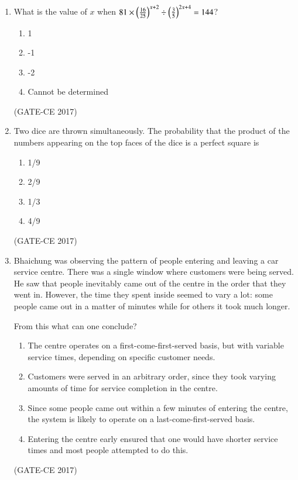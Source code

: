 \documentclass[journal,12pt,onecolumn]{article}
\theoremstyle{remark}
\begin{document}
\begin{enumerate}
    \item What is the value of $ x $ when $ 81 \times \left(\frac{16}{25}\right)^{x+2} \div \left(\frac{3}{5}\right)^{2x+4} = 144 $?
    \begin{multicols}{2}
    \begin{enumerate}
        \item 1  
        \item -1  
        \item -2  
        \item Cannot be determined  
    \end{enumerate}
    \end{multicols}
    \hfill (GATE-CE 2017)

    \item Two dice are thrown simultaneously. The probability that the product of the numbers appearing on the top faces of the dice is a perfect square is
    \begin{multicols}{4}
    \begin{enumerate}
        \item 1/9  
        \item 2/9  
        \item 1/3  
        \item 4/9  
    \end{enumerate}
    \end{multicols}
   \hfill (GATE-CE 2017)

    \item Bhaichung was observing the pattern of people entering and leaving a car service centre. There was a single window where customers were being served. He saw that people inevitably came out of the centre in the order that they went in. However, the time they spent inside seemed to vary a lot: some people came out in a matter of minutes while for others it took much longer.
    
    From this what can one conclude?
    \begin{enumerate}
        \item The centre operates on a first-come-first-served basis, but with variable service times, depending on specific customer needs.  
        \item Customers were served in an arbitrary order, since they took varying amounts of time for service completion in the centre.  
        \item Since some people came out within a few minutes of entering the centre, the system is likely to operate on a last-come-first-served basis.  
        \item Entering the centre early ensured that one would have shorter service times and most people attempted to do this.  
    \end{enumerate}
    \hfill (GATE-CE 2017)


\end{enumerate}
\end{document}

